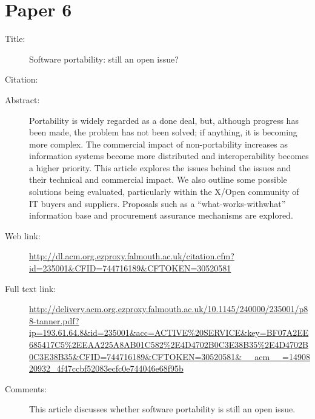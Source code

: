\documentclass{scrartcl}
\begin{document}
\section*{Paper 6}
\begin{description}
\item[Title:] Software portability: still an open issue?
\item[Citation:] \cite{Tanner:1996:SPS:234999.235001}
\item[Abstract:] Portability is widely regarded as a
done deal, but, although progress has
been made, the problem has not been
solved; if anything, it is becoming
more complex. The commercial
impact of non-portability increases as
information systems become more
distributed and interoperability
becomes a higher priority. This article
explores the issues behind the issues and their
technical and commercial impact. We also outline
some possible solutions being evaluated, particularly
within the X/Open community of IT buyers and
suppliers. Proposals such as a “what-works-withwhat”
information base and procurement assurance
mechanisms are explored.
\item[Web link:] \url{http://dl.acm.org.ezproxy.falmouth.ac.uk/citation.cfm?id=235001&CFID=744716189&CFTOKEN=30520581}
\item[Full text link:] \url{http://delivery.acm.org.ezproxy.falmouth.ac.uk/10.1145/240000/235001/p88-tanner.pdf?ip=193.61.64.8&id=235001&acc=ACTIVE%20SERVICE&key=BF07A2EE685417C5%2EEAA225A8AB01C582%2E4D4702B0C3E38B35%2E4D4702B0C3E38B35&CFID=744716189&CFTOKEN=30520581&__acm__=1490820932_4f47ccbf52083ecfc0e744046e68f95b}
\item[Comments:] This article discusses whether software portability is still an open issue.
\end{description}
\end{document}
